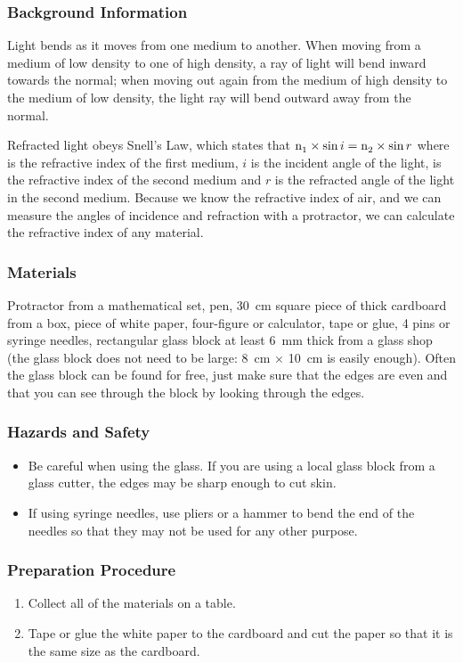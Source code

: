 \subsubsection*{Background Information}
Light bends as it moves from one medium to another. When moving from a medium of low density to one of high density, a ray of light will bend inward towards the normal; when moving out again from the medium of high density to the medium of low density, the light ray will bend outward away from the normal.

Refracted light obeys Snell's Law, which states that $\ce{n1} \times \sin i = \ce{n2} \times \sin r$ where  is the refractive index of the first medium, $i$ is the incident angle of the light,  is the refractive index of the second medium and $r$ is the refracted angle of the light in the second medium. Because we know the refractive index of air, and we can measure the angles of incidence and refraction with a protractor, we can calculate the refractive index of any material.  

\subsubsection*{Materials}
Protractor from a mathematical set, pen, 30~cm square piece of thick cardboard from a box, piece of white paper, four-figure or calculator, tape or glue, 4 pins or syringe needles, rectangular glass block at least 6~mm thick from a glass shop (the glass block does not need to be large: 8~cm $\times$ 10~cm is easily enough). Often the glass block can be found for free, just make sure that the edges are even and that you can see through the block by looking through the edges.  

\subsubsection*{Hazards and Safety}
\begin{itemize}
\item{Be careful when using the glass.  If you are using a local glass block from a glass cutter, the edges may be sharp enough to cut skin.}
\item{If using syringe needles, use pliers or a hammer to bend the end of the needles so that they may not be used for any other purpose.}
\end{itemize}

\subsubsection*{Preparation Procedure}
\begin{enumerate}
\item{Collect all of the materials on a table.} 
\item{Tape or glue the white paper to the cardboard and cut the paper so that it is the same size as the cardboard.} 
\end{enumerate}

